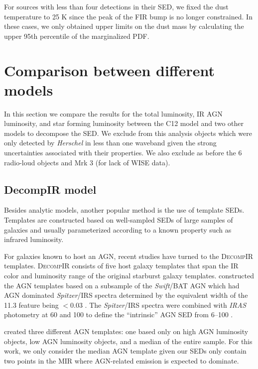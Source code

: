 \documentclass[fleqn, usenatbib]{mnras}
\newcommand{\herschel}{\emph{Herschel}}
\newcommand{\swift}{\textit{Swift}}
\begin{document}
For sources with less than four detections in their SED, we fixed the dust temperature to 25 K since the peak of the FIR bump is no longer constrained. In these cases, we only obtained upper limits on the dust mass by calculating the upper 95th percentile of the marginalized PDF.

\section{Comparison between different models}\label{sec:comp_models}
In this section we compare the results for the total luminosity, IR AGN luminosity, and star forming luminosity between the C12 model and two other models to decompose the SED. We exclude from this analysis objects which were only detected by \herschel{} in less than one waveband given the strong uncertainties associated with their properties. We also exclude as before the 6 radio-loud objects and Mrk 3 (for lack of WISE data). 

\subsection{DecompIR model}
Besides analytic models, another popular method is the use of template SEDs. Templates are constructed based on well-sampled SEDs of large samples of galaxies and usually parameterized according to a known property such as infrared luminosity.

For galaxies known to host an AGN, recent studies have turned to the \textsc{DecompIR} \citep{Mullaney:2011yq} templates. \textsc{DecompIR} consists of five host galaxy templates that span the IR color and luminosity range of the original \citet{Brandl:2006kx} starburst galaxy templates. \citet{Mullaney:2011yq} constructed the AGN templates based on a subsample of the \swift/BAT AGN which had AGN dominated \textit{Spitzer}/IRS spectra determined by the equivalent width of the 11.3 \micron{} feature being $<0.03$ \micron. The \textit{Spitzer}/IRS spectra were combined with \textit{IRAS} photometry at 60 and 100 \micron{} to define the ``intrinsic'' AGN SED from 6--100 \micron. 

\citet{Mullaney:2011yq} created three different AGN templates: one based only on high AGN luminosity objects, low AGN luminosity objects, and a median of the entire sample. For this work, we only consider the median AGN template given our SEDs only contain two points in the MIR where AGN-related emission is expected to dominate. 
\end{document}
